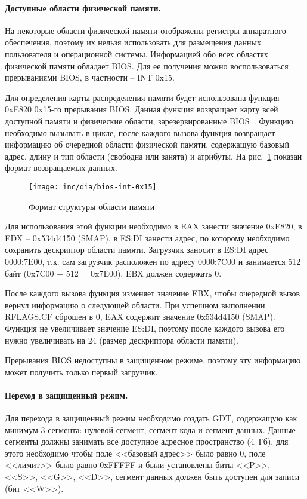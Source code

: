 \paragraph{Доступные области физической памяти.} На некоторые области физической памяти
отображены регистры аппаратного обеспечения, поэтому их нельзя использовать для размещения
данных пользователя и операционной системы. Информацией обо всех областях физической памяти
обладает BIOS. Для ее получения можно воспользоваться прерываниями BIOS, в частности -- INT 0x15.

Для определения карты распределения памяти будет использована функция 0xE820 0x15-го прерывания
BIOS. Данная функция возвращает карту всей доступной памяти и физические области, зарезервированные
BIOS~\cite{bios_int15h}. Функцию необходимо вызывать в цикле, после каждого вызова функция возвращает
информацию об очередной области физической памяти, содержащую базовый адрес, длину и тип области
(свободна или занята) и атрибуты. На рис.~\ref{fig:bios-int-0x15} показан формат возвращаемых данных.

\begin{figure}[ht!]
  \centering
  \texttt{[image: inc/dia/bios-int-0x15]}
  \caption{Формат структуры области памяти}
  \label{fig:bios-int-0x15}
\end{figure}

Для использования этой функции необходимо в EAX занести значение 0xE820, в EDX -- 0x534d4150 (SMAP),
в ES:DI занести адрес, по которому необходимо сохранить дескриптор области памяти. Загрузчик
заносит в ES:DI адрес 0000:7E00, т.к. сам загрузчик расположен по адресу 0000:7C00 и
занимается 512 байт (0x7C00 + 512 = 0x7E00). EBX должен содержать 0.

После каждого вызова функция изменяет значение EBX, чтобы очередной вызов вернул информацию о следующей
области. При успешном выполнении RFLAGS.CF сброшен в 0, EAX содержит значение 0x534d4150 (SMAP).
Функция не увеличивает значение ES:DI, поэтому после каждого вызова его нужно увеличивать на 24 (размер
дескриптора области памяти).

Прерывания BIOS недоступны в защищенном режиме, поэтому эту информацию может получить только первый загрузчик.

\paragraph{Переход в защищенный режим.} Для перехода в защищенный режим необходимо создать GDT,
содержащую как минимум 3 сегмента: нулевой сегмент, сегмент кода и сегмент данных. Данные сегменты
должны занимать все доступное адресное пространство (4~Гб), для этого необходимо чтобы поле
<<базовый адрес>> было равно 0, поле <<лимит>> было равно 0xFFFFF и были установлены биты
<<P>>, <<S>>, <<G>>, <<D>>, сегмент данных должен быть доступен для записи (бит <<W>>).

